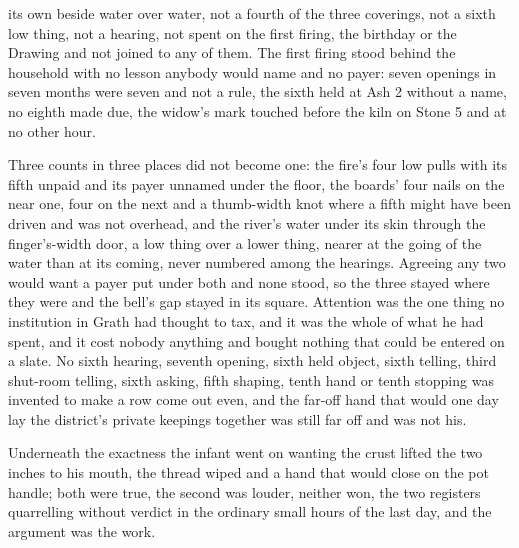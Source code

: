 its own beside water over water, not a fourth of the three coverings, not a sixth low thing, not a hearing, not spent on the first firing, the birthday or the Drawing and not joined to any of them. The first firing stood behind the household with no lesson anybody would name and no payer: seven openings in seven months were seven and not a rule, the sixth held at Ash 2 without a name, no eighth made due, the widow's mark touched before the kiln on Stone 5 and at no other hour.

Three counts in three places did not become one: the fire's four low pulls with its fifth unpaid and its payer unnamed under the floor, the boards' four nails on the near one, four on the next and a thumb-width knot where a fifth might have been driven and was not overhead, and the river's water under its skin through the finger's-width door, a low thing over a lower thing, nearer at the going of the water than at its coming, never numbered among the hearings. Agreeing any two would want a payer put under both and none stood, so the three stayed where they were and the bell's gap stayed in its square. Attention was the one thing no institution in Grath had thought to tax, and it was the whole of what he had spent, and it cost nobody anything and bought nothing that could be entered on a slate. No sixth hearing, seventh opening, sixth held object, sixth telling, third shut-room telling, sixth asking, fifth shaping, tenth hand or tenth stopping was invented to make a row come out even, and the far-off hand that would one day lay the district's private keepings together was still far off and was not his.

Underneath the exactness the infant went on wanting the crust lifted the two inches to his mouth, the thread wiped and a hand that would close on the pot handle; both were true, the second was louder, neither won, the two registers quarrelling without verdict in the ordinary small hours of the last day, and the argument was the work.

